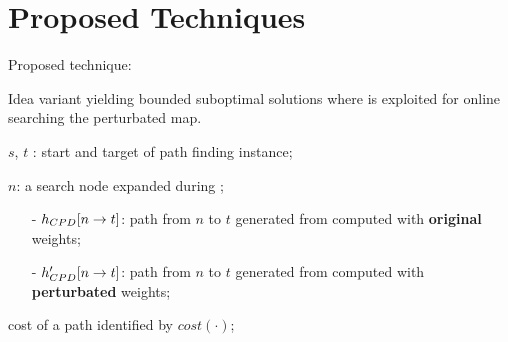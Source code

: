\section*{Proposed Techniques}

\begin{frame}{Proposed technique: \CPDSearch{}}
    \begin{block}{Idea}
        \A{} variant yielding bounded suboptimal solutions where \CPDPath{} is exploited for online searching the perturbated map.
    \end{block}

    $s$, $t$ : start and target of path finding instance;
    
    $n$: a search node expanded during \CPDSearch{};

    \begin{block}{}
        \begin{itemize}
            \item[-] $\CPDPath{}[n \rightarrow t]$: path from $n$ to $t$ generated from \CPD{} computed with \textbf{original} weights;
            \item[-] $\CPDPathNew{}[n \rightarrow t]$: path from $n$ to $t$ generated from \CPD{} computed with \textbf{perturbated} weights;
        \end{itemize} 
    \end{block}

    cost of a path identified by $cost(\cdot)$;
\end{frame}

